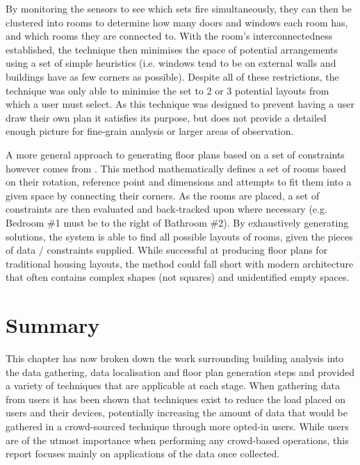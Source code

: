 \documentclass{UoYCSproject}
\begin{document}
            By monitoring the sensors to see which sets fire simultaneously, they can then be clustered into rooms to determine how many doors and windows each room has, and which rooms they are connected to. With the room's interconnectedness established, the technique then minimises the space of potential arrangements using a set of simple heuristics (i.e. windows tend to be on external walls and buildings have as few corners as possible). Despite all of these restrictions, the technique was only able to minimise the set to 2 or 3 potential layouts from which a user must select. As this technique was designed to prevent having a user draw their own plan it satisfies its purpose, but does not provide a detailed enough picture for fine-grain analysis or larger areas of observation.
            
            A more general approach to generating floor plans based on a set of constraints however comes from \citet{charman1994constraint}. This method mathematically defines a set of rooms based on their rotation, reference point and dimensions and attempts to fit them into a given space by connecting their corners. As the rooms are placed, a set of constraints are then evaluated and back-tracked upon where necessary (e.g. Bedroom \#1 must be to the right of Bathroom \#2). By exhaustively generating solutions, the system is able to find all possible layouts of rooms, given the pieces of data / constraints supplied. While successful at producing floor plans for traditional housing layouts, the method could fall short with modern architecture that often contains complex shapes (not squares) and unidentified empty spaces.
            
        \section{Summary}
        \label{sec:relsum}
        
	        This chapter has now broken down the work surrounding building analysis into the data gathering, data localisation and floor plan generation steps and provided a variety of techniques that are applicable at each stage. When gathering data from users it has been shown that techniques exist to reduce the load placed on users and their devices, potentially increasing the amount of data that would be gathered in a crowd-sourced technique through more opted-in users. While users are of the utmost importance when performing any crowd-based operations, this report focuses mainly on applications of the data once collected.
            
\end{document}
